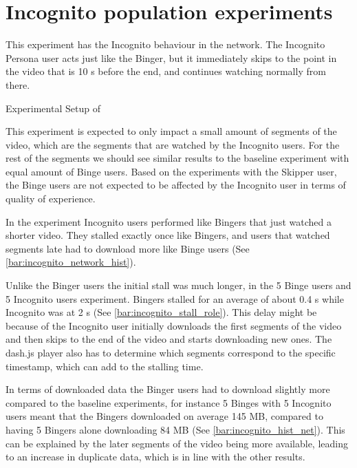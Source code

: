 \if{}

\fi
 
\FloatBarrier \section{Incognito population experiments}
\label{sec:eval_incognito}
This experiment has the Incognito behaviour in the network.
The Incognito Persona user acts just like the Binger, but it immediately skips to the point in the video that is 10 \ac{s} before the end, and continues watching normally from there.

\begin{table}[!htbp]
    \myfloatalign
    \caption[Experimental Setup of Incognito]{Experimental Setup of }
    \label{tab:exp_overview_incognito}
    
\end{table}

This experiment is expected to only impact a small amount of segments of the video, which are the segments that are watched by the Incognito users.
For the rest of the segments we should see similar results to the baseline experiment with equal amount of Binge users. Based on the experiments with the Skipper user, the Binge users are not expected to be affected by the Incognito user in terms of quality of experience.

In the experiment Incognito users performed like Bingers that just watched a shorter video. They stalled exactly once like Bingers, and users that watched segments late had to download more like Binge users (See \autoref{bar:incognito_network_hist}). 

\if{}

\fi

Unlike the Binger users the initial stall was much longer, in the 5 Binge users and 5 Incognito users experiment. Bingers stalled for an average of about 0.4 \ac{s} while Incognito was at 2 \ac{s} (See \autoref{bar:incognito_stall_role}). This delay might be because of the Incognito user initially downloads the first segments of the video and then skips to the end of the video and starts downloading new ones. The dash.js player also has to determine which segments correspond to the specific timestamp, which can add to the stalling time.

\if{}

\fi

In terms of downloaded data the Binger users had to download slightly more compared to the baseline experiments, for instance 5 Binges with 5 Incognito users meant that the Bingers downloaded on average 145 \ac{MB}, compared to having 5 Bingers alone downloading 84 \ac{MB} (See \autoref{bar:incognito_hist_net}). This can be explained by the later segments of the video being more available, leading to an increase in duplicate data, which is in line with the other results.


